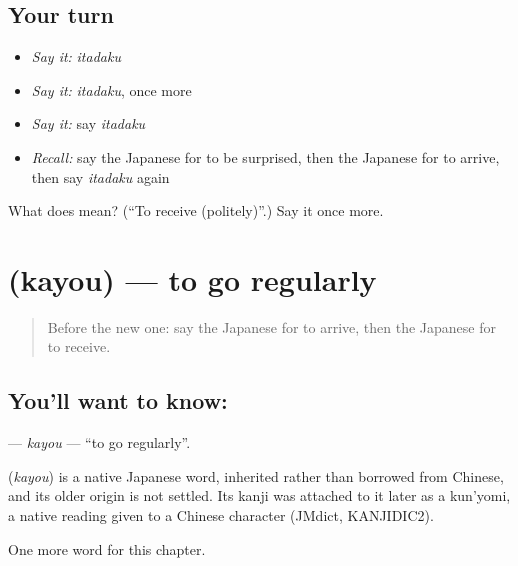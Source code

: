 \subsection*{Your turn}
\begin{itemize}
\raggedright
  \item \emph{Say it:} \emph{itadaku}
  \item \emph{Say it:} \emph{itadaku}, once more
  \item \emph{Say it:} say \emph{itadaku}
  \item \emph{Recall:} say the Japanese for to be surprised, then the Japanese for to arrive, then say \emph{itadaku} again
\end{itemize}

\begin{tcolorbox}[breakable,colback=teal!4,colframe=teal!35!black,title={Before you move on}]
What does  mean? (\textquotedblleft{}To receive (politely)\textquotedblright{}.) Say it once more.
\end{tcolorbox}
\section[\texorpdfstring{\ja{かよう} (kayou)}{かよう (kayou)}]{ (kayou) — to go regularly}

\label{lesson:JA-C90-kayou}



\begin{quote}
Before the new one: say the Japanese for to arrive, then the Japanese for to receive.
\end{quote}

\subsection*{You'll want to know: }
\textbf{} — \emph{kayou} — \textquotedblleft{}to go regularly\textquotedblright{}.

\begin{cousinweb}
\textbf{} (\emph{kayou}) is a native Japanese word, inherited rather than borrowed from Chinese, and its older origin is not settled. Its kanji was attached to it later as a kun'yomi, a native reading given to a Chinese character (JMdict, KANJIDIC2).
\end{cousinweb}

\begin{grammarlens}[title={What you've built}]
One more word for this chapter.
\end{grammarlens}

